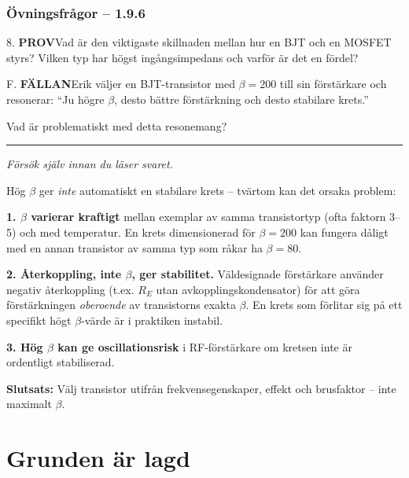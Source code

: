 \documentclass[a4paper,11pt,twoside]{book}
\newcommand{\qprov}{\colorbox{redpale}{\textcolor{reddark}{\headingfont\bfseries\tiny PROV}}}
\newcommand{\qfallan}{\colorbox{ljusbrun}{\textcolor{kakao}{\headingfont\bfseries\tiny FÄLLAN}}}
\begin{document}
\subsubsection*{Övningsfrågor -- 1.9.6}

\begin{qblock}{8.}
\qprov\quad Vad är den viktigaste skillnaden mellan hur
en BJT och en MOSFET styrs? Vilken typ har högst
ingångsimpedans och varför är det en fördel?
\end{qblock}

\begin{qblock}{F.}
\qfallan\quad Erik väljer en BJT-transistor med $\beta = 200$
till sin förstärkare och resonerar: ``Ju högre $\beta$, desto
bättre förstärkning och desto stabilare krets.''

Vad är problematiskt med detta resonemang?
\end{qblock}

\medskip
\noindent\rule{\textwidth}{0.4pt}
{\small\itshape Försök själv innan du läser svaret.}
\medskip

\begin{worked}[title={Lösning -- Fallgropsfråga 1.9.6\,F}]
Hög $\beta$ ger \emph{inte} automatiskt en stabilare krets --
tvärtom kan det orsaka problem:

\textbf{1. $\beta$ varierar kraftigt} mellan exemplar av samma
transistortyp (ofta faktorn 3--5) och med temperatur. En krets
dimensionerad för $\beta = 200$ kan fungera dåligt med en annan
transistor av samma typ som råkar ha $\beta = 80$.

\textbf{2. Återkoppling, inte $\beta$, ger stabilitet.}
Väldesignade förstärkare använder negativ återkoppling
(t.ex. $R_E$ utan avkopplingskondensator) för att göra
förstärkningen \emph{oberoende} av transistorns exakta $\beta$.
En krets som förlitar sig på ett specifikt högt $\beta$-värde
är i praktiken instabil.

\textbf{3. Hög $\beta$ kan ge oscillationsrisk} i RF-förstärkare
om kretsen inte är ordentligt stabiliserad.

\textbf{Slutsats:} Välj transistor utifrån frekvensegenskaper,
effekt och brusfaktor -- inte maximalt $\beta$.
\end{worked}

\section*{Grunden är lagd}
\end{document}
